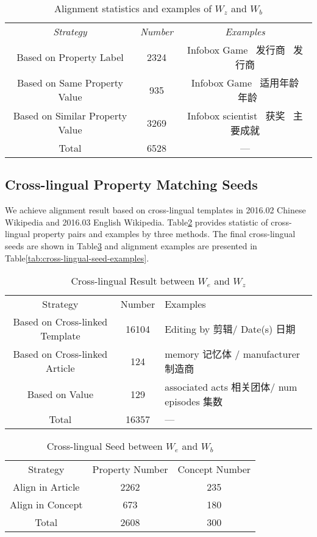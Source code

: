 \documentclass[runningheads,a4paper]{llncs}
\begin{document}
\begin{table}[htb]
  \centering
  \caption{Alignment statistics and examples of $W_z$ and $W_b$}
  \label{tab:zhwiki-baidu-cross-lingual}
    \begin{tabular}{ccc}
      {\emph{Strategy}} & {\emph{Number}} &  {\emph{Examples}} \\
      Based on Property Label & 2324 & Infobox Game \  发行商  \ 发行商  \\
      Based on Same Property Value & 935  & Infobox Game \  适用年龄 \   年龄 \\
      Based on Similar Property Value & 3269 & Infobox scientist \ 获奖 \   主要成就  \\
      Total           & 6528 & —  \\
    \end{tabular}
\end{table}

\subsection{Cross-lingual Property Matching Seeds}
We achieve alignment result based on cross-lingual templates in 2016.02 Chinese Wikipedia and 2016.03 English Wikipedia. Table\ref{tab:zhwiki-enwiki-cross-lingual} provides statistic of cross-lingual property pairs and examples by three methods. The final cross-lingual seeds are shown in Table\ref{tab:cross-lingual-seed} and alignment examples are presented in Table\ref{tab:cross-lingual-seed-examples}.

\begin{table}[htb]
  \centering
  \caption{Cross-lingual Result between $W_e$ and $W_z$}
  \label{tab:zhwiki-enwiki-cross-lingual}
    \begin{tabular}{ccl}
      {Strategy} & {Number} &  {Examples} \\
      Based on Cross-linked Template & 16104 & Editing by  剪辑/ Date(s) 日期   \\
      Based on Cross-linked Article & 124   & memory 记忆体 / manufacturer 制造商\\
      Based on Value     & 129   & associated acts 相关团体/ num episodes 集数  \\
      Total               & 16357 & —  \\
    \end{tabular}
\end{table}

\begin{table}[htb]
  \centering
  \caption{Cross-lingual Seed between $W_e$ and $W_b$}
  \label{tab:cross-lingual-seed}
    \begin{tabular}{ccc}
      {Strategy} & {Property Number} & {Concept Number} \\
      Align in Article & 2262  & 235 \\
      Align in Concept & 673   & 180 \\
      Total       & 2608  & 300 \\
    \end{tabular}
\end{table}
\end{document}
